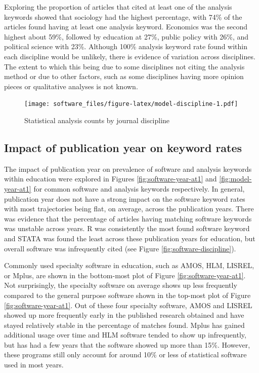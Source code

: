 \documentclass[
  english,
  ,man]{apa6}
\begin{document}
Exploring the proportion of articles that cited at least one of the analysis keywords showed that sociology had the highest percentage, with 74\% of the articles found having at least one analysis keyword. Economics was the second highest about 59\%, followed by education at 27\%, public policy with 26\%, and political science with 23\%. Although 100\% analysis keyword rate found within each discipline would be unlikely, there is evidence of variation across disciplines. The extent to which this being due to some disciplines not citing the analysis method or due to other factors, such as some disciplines having more opinion pieces or qualitative analyses is not known.

\begin{figure}
\centering
\texttt{[image: software\_files/figure-latex/model-discipline-1.pdf]}
\caption{\label{fig:model-discipline}Statistical analysis counts by journal discipline}
\end{figure}

\hypertarget{impact-of-publication-year-on-keyword-rates}{%
\subsection{Impact of publication year on keyword rates}\label{impact-of-publication-year-on-keyword-rates}}

The impact of publication year on prevalence of software and analysis keywords within education were explored in Figures \ref{fig:software-year-at1} and \ref{fig:model-year-at1} for common software and analysis keywords respectively. In general, publication year does not have a strong impact on the software keyword rates with most trajectories being flat, on average, across the publication years. There was evidence that the percentage of articles having matching software keywords was unstable across years. R was consistently the most found software keyword and STATA was found the least across these publication years for education, but overall software was infrequently cited (see Figure \ref{fig:software-discipline}).

Commonly used specialty software in education, such as AMOS, HLM, LISREL, or Mplus, are shown in the bottom-most plot of Figure \ref{fig:software-year-at1}. Not surprisingly, the specialty software on average shows up less frequently compared to the general purpose software shown in the top-most plot of Figure \ref{fig:software-year-at1}. Out of these four specialty software, AMOS and LISREL showed up more frequently early in the published research obtained and have stayed relatively stable in the percentage of matches found. Mplus has gained additional usage over time and HLM software tended to show up infrequently, but has had a few years that the software showed up more than 15\%. However, these programs still only account for around 10\% or less of statistical software used in most years.
\end{document}
